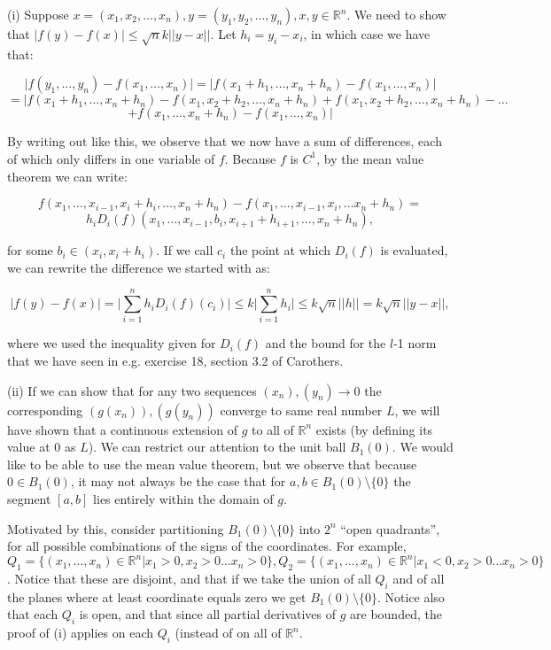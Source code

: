 \begin{solution}
    
    (i) Suppose $x = (x_1, x_2, \ldots, x_n), y = (y_1, y_2, \ldots, y_n), x, y \in \mathbb{R}^n$.
    We need to show that $\lvert f(y) - f(x) \rvert \leq \sqrt{n}k \lvert \lvert y - x \rvert \rvert$.
    Let $h_i = y_i - x_i$, in which case we have that:

    $$\lvert f(y_1, \ldots, y_n) - f(x_1, \ldots, x_n) \rvert = \lvert f(x_1 + h_1, \ldots, x_n + h_n) - f(x_1, \ldots, x_n) \rvert$$
    $$= \lvert f(x_1 + h_1, \ldots, x_n + h_n) - f(x_1, x_2 + h_2, \ldots, x_n + h_n) + f(x_1, x_2 + h_2, \ldots, x_n + h_n) - \ldots$$
    $$ + f(x_1, \ldots, x_n + h_n) - f(x_1, \ldots, x_n) \rvert $$

    By writing out like this, we observe that we now have a sum of differences, each of which only differs in one variable of $f$.
    Because $f$ is $C^1$, by the mean value theorem we can write:

    $$f(x_1, \ldots, x_{i-1}, x_i + h_i, \ldots, x_n + h_n) - f(x_1, \ldots, x_{i-1}, x_i, \ldots x_n + h_n) = $$
    $$h_i D_i (f)(x_1, \ldots, x_{i-1}, b_i, x_{i+1} + h_{i+1}, \ldots, x_n + h_n),$$

    for some $b_i \in (x_i, x_i + h_i)$.
    If we call $c_i$ the point at which $D_i(f)$ is evaluated, we can rewrite the difference we started with as:

    $$\lvert f(y) - f(x) \rvert = \lvert \sum_{i=1}^{n} h_i D_i (f)(c_i) \rvert \leq k \lvert \sum_{i=1}^{n} h_i \rvert \leq k \sqrt{n} \lvert \lvert h \rvert \rvert = k \sqrt{n} \lvert \lvert y - x \rvert \rvert,$$

    where we used the inequality given for $D_i(f)$ and the bound for the $l$-1 norm that we have seen in e.g. exercise 18, section 3.2 of Carothers.

    (ii) If we can show that for any two sequences $(x_n), (y_n) \rightarrow 0$ the corresponding $(g(x_n)), (g(y_n))$ converge to same real number $L$, we will have shown that a continuous extension of $g$ to all of $\mathbb{R}^n$ exists (by defining its value at 0 as $L$).
    We can restrict our attention to the unit ball $B_1(0)$.
    We would like to be able to use the mean value theorem, but we observe that because $0 \in B_1(0)$, it may not always be the case that for $a, b \in B_1(0) \setminus \{0\}$ the segment $[a, b]$ lies entirely within the domain of $g$.

    Motivated by this, consider partitioning $B_1(0) \setminus \{0\}$ into $2^n$ ``open quadrants'', for all possible combinations of the signs of the coordinates.
    For example,  $Q_1 = \{(x_1, \ldots, x_n) \in \mathbb{R}^n \lvert x_1 > 0, x_2 > 0\ldots x_n > 0\}, Q_2 = \{(x_1, \ldots, x_n) \in \mathbb{R}^n \lvert x_1 < 0, x_2 > 0\ldots x_n > 0\}$.
    Notice that these are disjoint, and that if we take the union of all $Q_i$ and of all the planes where at least coordinate equals zero we get $B_1(0) \setminus \{0\}$.
    Notice also that each $Q_i$ is open, and that since all partial derivatives of $g$ are bounded, the proof of (i) applies on each $Q_i$ (instead of on all of $\mathbb{R}^n$.


\end{solution}
